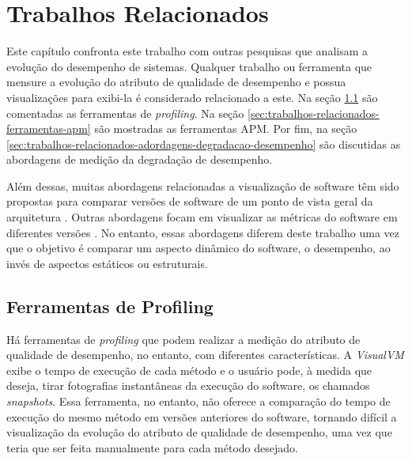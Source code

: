 \chapter{Trabalhos Relacionados} \label{ch:trabalhos-relacionados}

Este capítulo confronta este trabalho com outras pesquisas que analisam a evolução do desempenho de sistemas. Qualquer trabalho ou ferramenta que mensure a evolução do atributo de qualidade de desempenho e possua visualizações para exibi-la é considerado relacionado a este. Na seção \ref{sec:trabalhos-relacionados-ferramentas-profiling} são comentadas as ferramentas de \textit{profiling}. Na seção \ref{sec:trabalhos-relacionados-ferramentas-apm} são mostradas as ferramentas APM. Por fim, na seção \ref{sec:trabalhos-relacionados-adordagens-degradacao-desempenho} são discutidas as abordagens de medição da degradação de desempenho.

Além dessas, muitas abordagens relacionadas a visualização de software têm sido propostas para comparar versões de software de um ponto de vista geral da arquitetura \cite{Steinbruckner2010b}\cite{Telea2008}\cite{Collberg2003}\cite{Eick1992}\cite{Holten2008}. Outras abordagens focam em visualizar as métricas do software em diferentes versões \cite{Langelier2008}\cite{Lanza2001}\cite{Pinzger2005}\cite{Wettel2008}. No entanto, essas abordagens diferem deste trabalho uma vez que o objetivo é comparar um aspecto dinâmico do software, o desempenho, ao invés de aspectos estáticos ou estruturais.

\section{Ferramentas de Profiling} \label{sec:trabalhos-relacionados-ferramentas-profiling}

Há ferramentas de \textit{profiling} que podem realizar a medição do atributo de qualidade de desempenho, no entanto, com diferentes características. A \textit{VisualVM} \cite{Vis} exibe o tempo de execução de cada método e o usuário pode, à medida que deseja, tirar fotografias instantâneas da execução do software, os chamados \textit{snapshots}. Essa ferramenta, no entanto, não oferece a comparação do tempo de execução do mesmo método em versões anteriores do software, tornando difícil a visualização da evolução do atributo de qualidade de desempenho, uma vez que teria que ser feita manualmente para cada método desejado.

